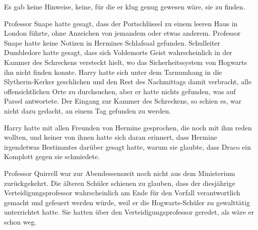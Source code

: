 Es gab keine Hinweise, keine, für die er klug genug gewesen wäre, sie zu finden.



Professor Snape hatte gesagt, dass der Portschlüssel zu einem leeren Haus in London führte, ohne Anzeichen von jemandem oder etwas anderem. Professor Snape hatte keine Notizen in Hermines Schlafsaal gefunden. Schulleiter Dumbledore hatte gesagt, dass sich Voldemorts Geist wahrscheinlich in der Kammer des Schreckens versteckt hielt, wo das Sicherheitssystem von Hogwarts ihn nicht finden konnte. Harry hatte sich unter dem Tarnumhang in die Slytherin-Kerker geschlichen und den Rest des Nachmittags damit verbracht, alle offensichtlichen Orte zu durchsuchen, aber er hatte nichts gefunden, was auf Parsel antwortete. Der Eingang zur Kammer des Schreckens, so schien es, war nicht dazu gedacht, an einem Tag gefunden zu werden.

Harry hatte mit allen Freunden von Hermine gesprochen, die noch mit ihm reden wollten, und keiner von ihnen hatte sich daran erinnert, dass Hermine irgendetwas Bestimmtes darüber gesagt hatte, warum sie glaubte, dass Draco ein Komplott gegen sie schmiedete.

Professor Quirrell war zur Abendessenszeit noch nicht aus dem Ministerium zurückgekehrt. Die älteren Schüler schienen zu glauben, dass der diesjährige Verteidigungsprofessor wahrscheinlich am Ende für den Vorfall verantwortlich gemacht und gefeuert werden würde, weil er die Hogwarts-Schüler zu gewalttätig unterrichtet hatte. Sie hatten über den Verteidigungsprofessor geredet, als wäre er schon weg.

